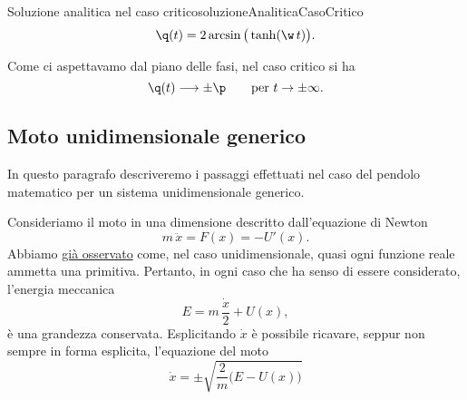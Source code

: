 \begin{remark}{Soluzione analitica nel caso critico}{soluzioneAnaliticaCasoCritico}
	\[
		\q(t) = 2\arcsin\big(\tanh(\w\,t)\big).
	\]
\end{remark}

\begin{oss}
	Come ci aspettavamo dal piano delle fasi, nel caso critico si ha
	\[
		\q(t) \longrightarrow \pm \p \qquad\text{per }t \to \pm \infty.
	\]
\end{oss}
%
%
\subsection{Moto unidimensionale generico}

In questo paragrafo descriveremo i passaggi effettuati nel caso del pendolo matematico per un sistema unidimensionale generico.

Consideriamo il moto in una dimensione descritto dall'equazione di Newton
\[
	m\,\ddot{x} = F(x) = -U'(x).
\]
Abbiamo \hyperref[oss:conservazioneUnidim]{già osservato} come, nel caso unidimensionale, quasi ogni funzione reale ammetta una primitiva.
Pertanto, in ogni caso che ha senso di essere considerato, l'energia meccanica
\[
	E = m\,\frac{\dot{x}}{2} + U(x),
\]
è una grandezza conservata.
Esplicitando \(\dot{x}\) è possibile ricavare, seppur non sempre in forma esplicita, l'equazione del moto
\[
	\dot{x} = \pm \sqrt{\frac{2}{m}\big(E-U(x)\big)}
\]

